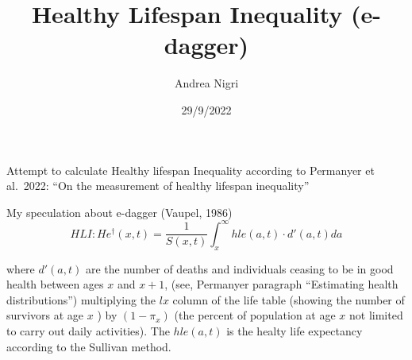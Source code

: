 \documentclass[
]{article}
\title{Healthy Lifespan Inequality (e-dagger)}
\author{Andrea Nigri}
\date{29/9/2022}
\begin{document}
\maketitle

Attempt to calculate Healthy lifespan Inequality according to Permanyer
et al.~2022: ``On the measurement of healthy lifespan inequality''

My speculation about e-dagger (Vaupel, 1986) \[
HLI:He^{\dagger}(x, t)=\frac{1}{S(x, t)} \int_{x}^{\infty} hle(a, t)\cdot d'(a, t)da
\]

where \(d'(a, t)\) are the number of deaths and individuals ceasing to
be in good health between ages \(x\) and \(x+1\), (see, Permanyer
paragraph ``Estimating health distributions'') multiplying the \(lx\)
column of the life table (showing the number of survivors at age \(x\) )
by $(1 − \pi_x)$ (the percent of population at age \(x\) not limited to
carry out daily activities). The \(hle(a, t)\) is the healty life
expectancy according to the Sullivan method.
\end{document}
